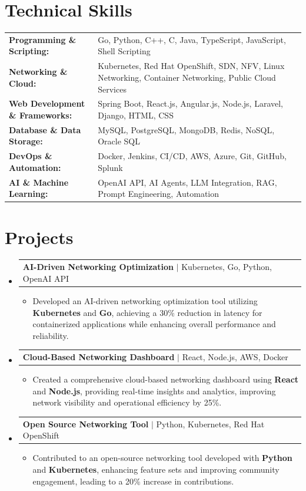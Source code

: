 \documentclass[letterpaper,10pt]{article}
\makeatletter
\newcommand{\resumeItem}[1]{
  \item{\fontsize{8pt}{9pt}\selectfont
    #1 \vspace{-3pt}
  }
}
\newcommand{\resumeProjectHeading}[2]{
    \item
    \begin{tabular*}{1.001\textwidth}{l@{\extracolsep{\fill}}r}
      \fontsize{8.5pt}{10pt}#1 & \textbf{\fontsize{8.5pt}{10pt} #2}\\
    \end{tabular*}\vspace{-7pt}
}
\newcommand{\resumeSubHeadingListStart}{\begin{itemize}[leftmargin=0pt, label={}]}
\newcommand{\resumeSubHeadingListEnd}{\end{itemize}}
\newcommand{\resumeItemListStart}{\begin{itemize}[leftmargin=*]}
\newcommand{\resumeItemListEnd}{\end{itemize}\vspace{-5pt}}
\makeatother
\begin{document}
\section{Technical Skills}
        \vspace{-14pt}
        \begin{table}[h]
            \fontsize{8pt}{9pt}\selectfont
            \begin{tabular}{p{0.3\linewidth} p{0.7\linewidth}}
                \textbf{Programming \& Scripting:} & Go, Python, C++, C, Java, TypeScript, JavaScript, Shell Scripting \\
                \textbf{Networking \& Cloud:} & Kubernetes, Red Hat OpenShift, SDN, NFV, Linux Networking, Container Networking, Public Cloud Services \\
                \textbf{Web Development \& Frameworks:} & Spring Boot, React.js, Angular.js, Node.js, Laravel, Django, HTML, CSS \\
                \textbf{Database \& Data Storage:} & MySQL, PostgreSQL, MongoDB, Redis, NoSQL, Oracle SQL \\
                \textbf{DevOps \& Automation:} & Docker, Jenkins, CI/CD, AWS, Azure, Git, GitHub, Splunk \\
                \textbf{AI \& Machine Learning:} & OpenAI API, AI Agents, LLM Integration, RAG, Prompt Engineering, Automation \\
            \end{tabular}
        \end{table}
 \vspace{-18pt}

\section{Projects}
    \vspace{-5pt}
    \resumeSubHeadingListStart
          \resumeProjectHeading
            {\textbf{AI-Driven Networking Optimization} $|$ Kubernetes, Go, Python, OpenAI API}{}
            \resumeItemListStart
                \resumeItem{Developed an AI-driven networking optimization tool utilizing \textbf{Kubernetes} and \textbf{Go}, achieving a 30\% reduction in latency for containerized applications while enhancing overall performance and reliability.}
            \resumeItemListEnd
        \vspace{-12pt}
    
        \resumeProjectHeading
            {\textbf{Cloud-Based Networking Dashboard} $|$ React, Node.js, AWS, Docker}{}
        \resumeItemListStart
                \resumeItem{Created a comprehensive cloud-based networking dashboard using \textbf{React} and \textbf{Node.js}, providing real-time insights and analytics, improving network visibility and operational efficiency by 25\%.}
        \resumeItemListEnd
      \vspace{-12pt}
      \resumeProjectHeading
        {\textbf{Open Source Networking Tool} $|$ Python, Kubernetes, Red Hat OpenShift}{}
    \resumeItemListStart
            \resumeItem{Contributed to an open-source networking tool developed with \textbf{Python} and \textbf{Kubernetes}, enhancing feature sets and improving community engagement, leading to a 20\% increase in contributions.}
    \resumeItemListEnd
    \resumeSubHeadingListEnd
\end{document}
